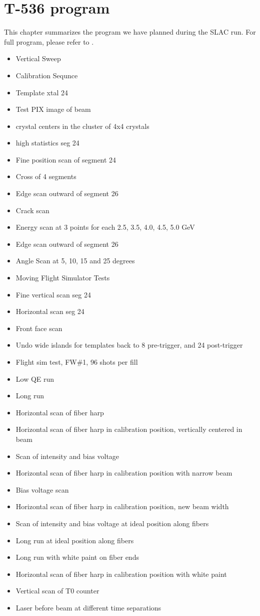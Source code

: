 \chapter{T-536 program}
\label{chap:program}

This chapter summarizes the program we have planned during the SLAC run. For full program, please refer to .

\begin{itemize}
\item Vertical Sweep 
\item Calibration Sequnce
\item Template xtal 24 
\item Test PIX image of beam 
\item crystal centers in the cluster of 4x4 crystals
\item high statistics seg 24 
\item Fine position scan of segment 24 
\item Cross of 4 segments 
\item Edge scan outward of segment 26 
\item Crack scan 
\item Energy scan at 3 points for each 2.5, 3.5, 4.0, 4.5, 5.0 GeV 
\item Edge scan outward of segment 26 
\item Angle Scan at 5, 10, 15 and 25 degrees 
\item Moving Flight Simulator Tests
\item Fine vertical scan seg 24 
\item Horizontal scan seg 24 
\item Front face scan 
\item Undo wide islands for templates back to 8 pre-trigger, and 24 post-trigger 
\item Flight sim test, FW\#1, 96 shots per fill 
\item Low QE run 
\item Long run 
\item Horizontal scan of fiber harp 
\item Horizontal scan of fiber harp in calibration position, vertically centered in beam 
\item Scan of intensity and bias voltage 
\item Horizontal scan of fiber harp in calibration position with narrow beam 
\item Bias voltage scan 
\item Horizontal scan of fiber harp in calibration position, new beam width 
\item Scan of intensity and bias voltage at ideal position along fibers 
\item Long run at ideal position along fibers 
\item Long run with white paint on fiber ends 
\item Horizontal scan of fiber harp in calibration position with white paint 
\item Vertical scan of T0 counter 
\item Laser before beam at different time separations 
\end{itemize}
